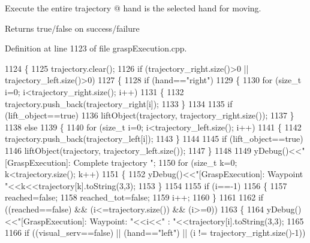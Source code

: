 Execute the entire trajectory @ hand is the selected hand for moving. 

\begin{DoxyReturn}{Returns}
true/false on success/failure 
\end{DoxyReturn}


Definition at line 1123 of file grasp\+Execution.\+cpp.


\begin{DoxyCode}
1124 \{
1125     trajectory.clear();
1126     \textcolor{keywordflow}{if} (trajectory\_right.size()>0 || trajectory\_left.size()>0)
1127     \{
1128         \textcolor{keywordflow}{if} (hand==\textcolor{stringliteral}{"right"})
1129         \{
1130             \textcolor{keywordflow}{for} (\textcolor{keywordtype}{size\_t} i=0; i<trajectory\_right.size(); i++)
1131             \{               
1132                 trajectory.push\_back(trajectory\_right[i]);
1133             \}
1134 
1135             \textcolor{keywordflow}{if} (lift\_object==\textcolor{keyword}{true})
1136                 liftObject(trajectory, trajectory\_right.size());
1137         \}
1138         \textcolor{keywordflow}{else}
1139         \{
1140             \textcolor{keywordflow}{for} (\textcolor{keywordtype}{size\_t} i=0; i<trajectory\_left.size(); i++)
1141             \{
1142                 trajectory.push\_back(trajectory\_left[i]);
1143             \}
1144 
1145             \textcolor{keywordflow}{if} (lift\_object==\textcolor{keyword}{true})
1146                 liftObject(trajectory, trajectory\_left.size());
1147         \}
1148 
1149         yDebug()<<\textcolor{stringliteral}{"[GraspExecution]: Complete trajectory "};
1150         \textcolor{keywordflow}{for} (\textcolor{keywordtype}{size\_t} k=0; k<trajectory.size(); k++)
1151         \{
1152             yDebug()<<\textcolor{stringliteral}{"[GraspExecution]: Waypoint "}<<k<<trajectory[k].toString(3,3);
1153         \}
1154 
1155         \textcolor{keywordflow}{if} (i==-1)
1156         \{
1157             reached=\textcolor{keyword}{false};
1158             reached_tot=\textcolor{keyword}{false};
1159             i++;
1160         \}
1161 
1162         \textcolor{keywordflow}{if} ((reached==\textcolor{keyword}{false}) && (i<=trajectory.size()) && (i>=0))
1163         \{
1164             yDebug()<<\textcolor{stringliteral}{"[GraspExecution]: Waypoint: "}<<i<<\textcolor{stringliteral}{" : "}<<trajectory[i].toString(3,3);
1165 
1166             \textcolor{keywordflow}{if} ((visual\_serv==\textcolor{keyword}{false}) || (hand==\textcolor{stringliteral}{"left"}) || (i != trajectory\_right.size()-1))

\end{DoxyCode}
